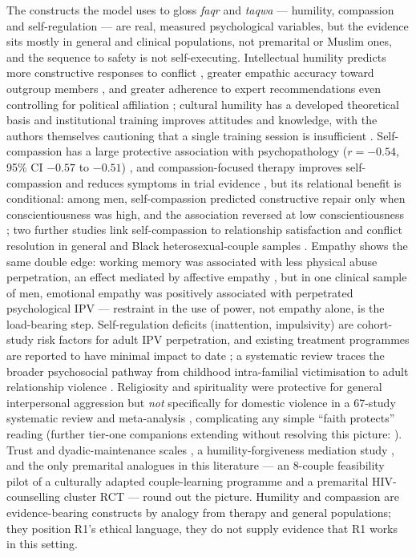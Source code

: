 \documentclass[11pt]{article}
\begin{document}
The constructs the model uses to gloss \emph{faqr} and \emph{taqwa} --- humility, compassion and self-regulation --- are real, measured psychological variables, but the evidence sits mostly in general and clinical populations, not premarital or Muslim ones, and the sequence to safety is not self-executing. Intellectual humility predicts more constructive responses to conflict \cite{ref203}, greater empathic accuracy toward outgroup members \cite{ref204}, and greater adherence to expert recommendations even controlling for political affiliation \cite{ref205}; cultural humility has a developed theoretical basis \cite{ref206,ref207} and institutional training improves attitudes and knowledge, with the authors themselves cautioning that a single training session is insufficient \cite{ref208}. Self-compassion has a large protective association with psychopathology ($r=-0.54$, 95\% CI $-0.57$ to $-0.51$) \cite{ref209}, and compassion-focused therapy improves self-compassion and reduces symptoms in trial evidence \cite{ref210}, but its relational benefit is conditional: among men, self-compassion predicted constructive repair only when conscientiousness was high, and the association reversed at low conscientiousness \cite{ref211}; two further studies link self-compassion to relationship satisfaction and conflict resolution in general and Black heterosexual-couple samples \cite{ref212,ref213}. Empathy shows the same double edge: working memory was associated with less physical abuse perpetration, an effect mediated by affective empathy \cite{ref214}, but in one clinical sample of men, emotional empathy was positively associated with perpetrated psychological IPV \cite{ref215} --- restraint in the use of power, not empathy alone, is the load-bearing step. Self-regulation deficits (inattention, impulsivity) are cohort-study risk factors for adult IPV perpetration, and existing treatment programmes are reported to have minimal impact to date \cite{ref216}; a systematic review traces the broader psychosocial pathway from childhood intra-familial victimisation to adult relationship violence \cite{ref217}. Religiosity and spirituality were protective for general interpersonal aggression but \emph{not} specifically for domestic violence in a 67-study systematic review and meta-analysis \cite{ref220}, complicating any simple ``faith protects'' reading (further tier-one companions extending without resolving this picture: \cite{ref221,ref223}). Trust and dyadic-maintenance scales \cite{ref218,ref219}, a humility-forgiveness mediation study \cite{ref202}, and the only premarital analogues in this literature --- an 8-couple feasibility pilot of a culturally adapted couple-learning programme \cite{ref100} and a premarital HIV-counselling cluster RCT \cite{ref224} --- round out the picture. Humility and compassion are evidence-bearing constructs by analogy from therapy and general populations; they position R1's ethical language, they do not supply evidence that R1 works in this setting.
\end{document}
